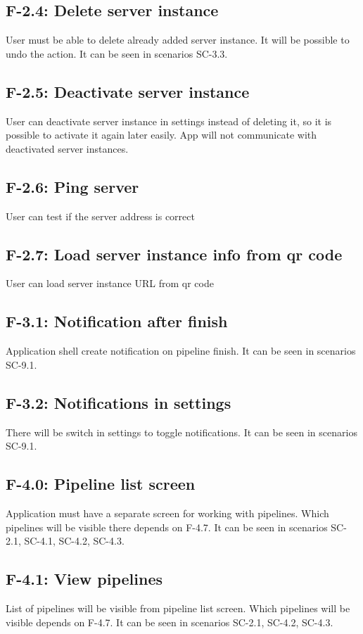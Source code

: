 \subsection*{F-2.4: Delete server instance}
User must be able to delete already added server instance. It will be possible to undo the action. It can be seen in scenarios SC-3.3.
\subsection*{F-2.5: Deactivate server instance}
User can deactivate server instance in settings instead of deleting it, so it is possible to activate it again later easily. App will not communicate with deactivated server instances.
\subsection*{F-2.6: Ping server}
\label{subsec:ping}
User can test if the server address is correct
\subsection*{F-2.7: Load server instance info from qr code}
User can load server instance URL from qr code
\subsection*{F-3.1: Notification after finish}
\label{subsec:notifications}
Application shell create notification on pipeline finish. It can be seen in scenarios SC-9.1.
\subsection*{F-3.2: Notifications in settings}
There will be switch in settings to toggle notifications. It can be seen in scenarios SC-9.1.
\subsection*{F-4.0: Pipeline list screen}
Application must have a separate screen for working with pipelines. Which pipelines will be visible there depends on F-4.7. It can be seen in scenarios SC-2.1, SC-4.1, SC-4.2, SC-4.3.
\subsection*{F-4.1: View pipelines}
List of pipelines will be visible from pipeline list screen. Which pipelines will be visible depends on F-4.7. It can be seen in scenarios SC-2.1, SC-4.2, SC-4.3.
